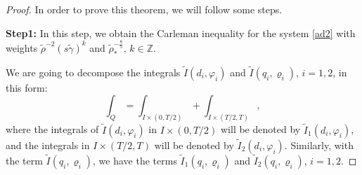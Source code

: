 \documentclass[11pt,a4paper]{amsart}
\numberwithin{equation}{section}
\begin{document}
\begin{proof}
In order to  prove this theorem, we will follow some steps.

\textbf{Step1:} In this  step,  we obtain  the Carleman inequality for the system \eqref{ad2}  with weights $\displaystyle \tilde{\rho}^{-2}(s\tilde{\gamma})^{k} $ and  $\tilde{\rho}^{-\frac{8}{5}}_{*},\, k\in \mathbb{Z}$.

\noindent We  are going  to decompose  the  integrals  $\tilde{I}(d_{i},\varphi_{i})$ and  $\tilde{I}(q_{i},\varrho_{i})$, $i=1, 2$, in this  form:
$$
\int_{Q}=\int_{I\times(0,T/2)}+\int_{I\times(T/2,T)},
$$where   the integrals of $\tilde{I}(d_{i},\varphi_{i})$  in $I\times(0,T/2)$  will be  denoted by  $\tilde{I}_{1}(d_{i},\varphi_{i})$, and  the  integrals in $I\times(T/2,T)$  will  be  denoted by $\tilde{I}_{2}(d_{i},\varphi_{i})$. Similarly, with  the term   $\tilde{I}(q_{i},\varrho_{i})$, we have the terms $\tilde{I}_{1}(q_{i},\varrho_{i})$ and  $\tilde{I}_{2}(q_{i},\varrho_{i})$, $i=1, 2$.



\end{proof}
\end{document}
